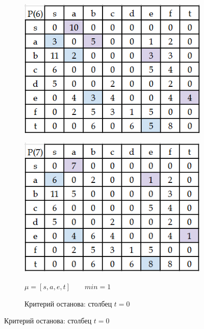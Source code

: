 \documentclass{article}
\begin{document}
\begin{enumerate}
\begin{figure}
\begin{subfigure}[b]{0.3\textwidth}
         \includegraphics[width=\textwidth]{attachments/16/6.png}
         \label{fig:16_6}
     \end{subfigure}
     \hfill
     \begin{subfigure}[b]{0.3\textwidth}
         \centering
         \caption*{\small{$\mu = [s, a, e, t]\qquad min = 1$}}
         \includegraphics[width=\textwidth]{attachments/16/7.png}
         \label{fig:16_7}
     \end{subfigure}
     \hfill
     \begin{subfigure}[b]{0.3\textwidth}
         \centering
         \caption*{\small{Критерий останова: столбец $t = 0$}}%

\end{subfigure}
\end{figure}
\end{enumerate}
\end{document}
